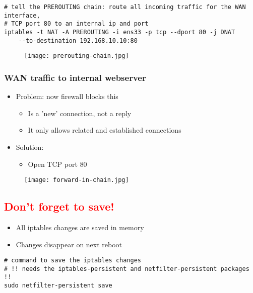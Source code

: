 \documentclass{article}
\begin{document}
\begin{verbatim}
# tell the PREROUTING chain: route all incoming traffic for the WAN interface, 
# TCP port 80 to an internal ip and port
iptables -t NAT -A PREROUTING -i ens33 -p tcp --dport 80 -j DNAT 
    --to-destination 192.168.10.10:80
\end{verbatim}

\begin{figure}[H]
    \centering
    \texttt{[image: prerouting-chain.jpg]}
\end{figure}

\subsubsection{WAN traffic to internal webserver}

\begin{itemize}
    \item Problem: now firewall blocks this
    \begin{itemize}
        \item Is a 'new' connection, not a reply
        \item It only allows related and established connections
    \end{itemize}
    \item Solution: 
    \begin{itemize}
        \item Open TCP port 80
    \end{itemize}
\end{itemize}

\begin{figure}[H]
    \centering
    \texttt{[image: forward-in-chain.jpg]}
\end{figure}


\subsection{\textcolor{red}{Don't forget to save!}}

\begin{itemize}
    \item All iptables changes are saved in memory
    \item Changes disappear on next reboot
\end{itemize}

\begin{verbatim}
# command to save the iptables changes
# !! needs the iptables-persistent and netfilter-persistent packages !!
sudo netfilter-persistent save
\end{verbatim}
\end{document}
